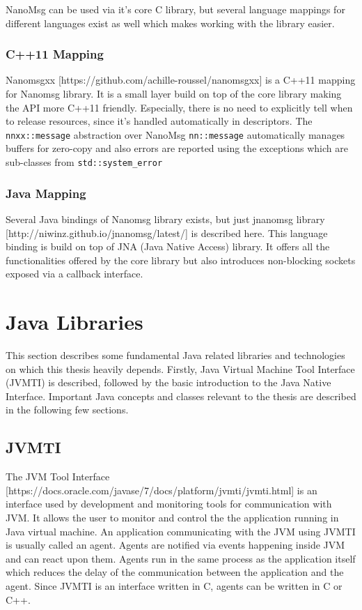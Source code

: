 NanoMsg can be used via it's core C library, but several language mappings for different languages exist as well which makes working with the library easier.
\subsubsection{C++11 Mapping}
Nanomsgxx [https://github.com/achille-roussel/nanomsgxx] is a C++11 mapping for Nanomsg library. It is a small layer build on top of the core library making the API more C++11  friendly. Especially, there is no need to explicitly tell when to release resources, since it's handled automatically in descriptors. The \texttt{nnxx::message} abstraction over NanoMsg \texttt{nn::message} automatically manages buffers for zero-copy and also errors are reported using the exceptions which are sub-classes from \texttt{std::system\_error}
\subsubsection{Java Mapping}
Several Java bindings of Nanomsg library exists, but just jnanomsg library [http://niwinz.github.io/jnanomsg/latest/] is described here. This language binding is build on top of JNA (Java Native Access) library. It offers all the functionalities offered by the core library but also introduces non-blocking sockets exposed via a callback interface.

\section{Java Libraries}
This section describes some fundamental Java related libraries and technologies on which this thesis heavily depends. Firstly, Java Virtual Machine Tool Interface (JVMTI) is described, followed by the basic introduction to the Java Native Interface. Important Java concepts and classes relevant to the thesis are described in the following few sections.
\subsection{JVMTI}
The JVM Tool Interface [https://docs.oracle.com/javase/7/docs/platform/jvmti/jvmti.html] is an interface used by development and monitoring tools for communication with JVM. It allows the user to monitor and control the the application running in Java virtual machine. An application communicating with the JVM using JVMTI is usually called an agent. Agents are notified via events happening inside JVM and can react upon them. Agents run in the same process as the application itself which reduces the delay of the communication between the application and the agent. Since JVMTI is an interface written in C, agents can be written in C or C++. 

